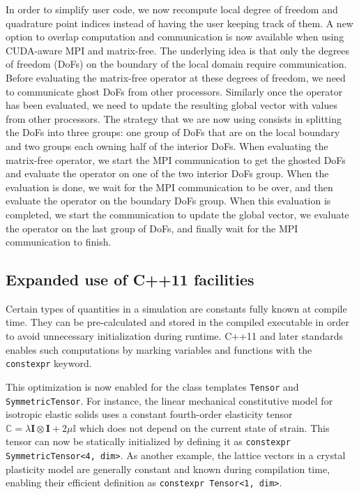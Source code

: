 \documentclass{ansarticle-preprint}
\begin{document}
In order to simplify user code, we now recompute
local degree of freedom and quadrature point indices instead of having the user
keeping track of them. A new option to overlap computation and communication is
now available when using CUDA-aware MPI and matrix-free. The underlying idea is
that only the degrees of freedom (DoFs) on the boundary of the local domain
require communication. Before evaluating the matrix-free operator at these
degrees of freedom, we need to communicate ghost DoFs from other
processors.  Similarly once the operator has been evaluated, we need to update
the resulting global vector with values from other processors. The strategy that
we are now using consists in splitting the DoFs into three groups: one group of DoFs
that are on the local boundary and two groups each owning half of the interior
DoFs. When evaluating the matrix-free operator, we start the MPI communication
to get the ghosted DoFs and evaluate the operator on one of the two interior
DoFs group. When the evaluation is done, we wait for the MPI
communication to be over, and
then evaluate the operator on the boundary DoFs group. When this evaluation is
completed, we start the communication to update the global vector, we evaluate the
operator on the last group of DoFs, and finally wait for the MPI
communication to finish.


\subsection{Expanded use of C++11 facilities}
\label{subsec:cxx}

Certain types of quantities in a simulation are constants fully known
at compile time. They can be pre-calculated and stored in the
compiled executable in order to avoid unnecessary initialization during
runtime. C++11 and later standards enables such computations by
marking variables and functions with the \texttt{constexpr} keyword.

This optimization is now enabled for the class templates
\texttt{Tensor} and \texttt{SymmetricTensor}.
For instance, the linear mechanical constitutive model for isotropic elastic solids
uses a constant fourth-order elasticity tensor
$\mathbb{C} = \lambda \boldsymbol{I} \otimes \boldsymbol{I} + 2 \mu \mathbb{I}$
which does not depend on the current state of strain.
This tensor can now be statically initialized by defining it as
\texttt{constexpr SymmetricTensor<4, dim>}.
As another example, the lattice vectors in a crystal plasticity model are generally
constant and known during compilation time, enabling their efficient definition as
\texttt{constexpr Tensor<1, dim>}.
\end{document}

